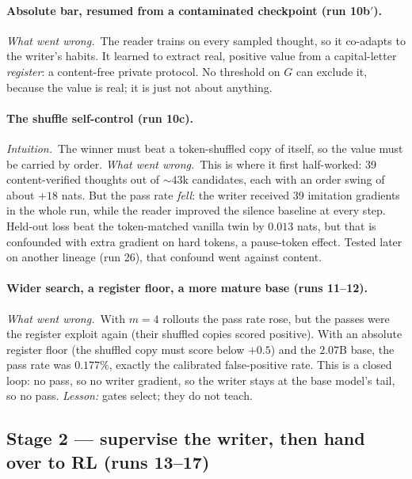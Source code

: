 \documentclass[11pt]{article}
\newcommand{\why}{\emph{Intuition.}\ }
\newcommand{\fail}{\emph{What went wrong.}\ }
\begin{document}
\paragraph{Absolute bar, resumed from a contaminated checkpoint (run 10b$'$).}
\fail The reader trains on every sampled thought, so it co-adapts to the writer's habits. It learned to extract real, positive value from a capital-letter \emph{register}: a content-free private protocol. No threshold on $G$ can exclude it, because the value is real; it is just not about anything.

\paragraph{The shuffle self-control (run 10c).}
\why The winner must beat a token-shuffled copy of itself, so the value must be carried by order.
\fail This is where it first half-worked: 39 content-verified thoughts out of ${\sim}43$k candidates, each with an order swing of about $+18$ nats. But the pass rate \emph{fell}: the writer received 39 imitation gradients in the whole run, while the reader improved the silence baseline at every step. Held-out loss beat the token-matched vanilla twin by $0.013$ nats, but that is confounded with extra gradient on hard tokens, a pause-token effect. Tested later on another lineage (run 26), that confound went against content.

\paragraph{Wider search, a register floor, a more mature base (runs 11--12).}
\fail With $m=4$ rollouts the pass rate rose, but the passes were the register exploit again (their shuffled copies scored positive). With an absolute register floor (the shuffled copy must score below $+0.5$) and the $2.07$B base, the pass rate was $0.177\%$, exactly the calibrated false-positive rate. This is a closed loop: no pass, so no writer gradient, so the writer stays at the base model's tail, so no pass. \emph{Lesson:} gates select; they do not teach.

\subsection*{Stage 2 --- supervise the writer, then hand over to RL (runs 13--17)}
\end{document}
